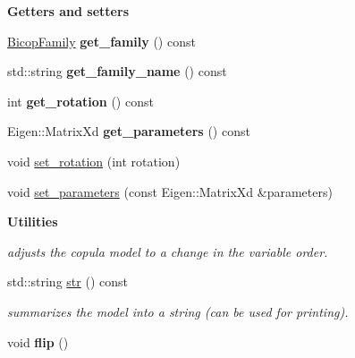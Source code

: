 \begin{Indent}{\bf Getters and setters}\par
\begin{DoxyCompactItemize}
\item 
\hyperlink{namespacevinecopulib_a42e95cc06d33896199caab0c11ad44f3}{Bicop\+Family} {\bfseries get\+\_\+family} () const \hypertarget{classvinecopulib_1_1_bicop_a68ab3556ee3bb3d02814fd978573bf3b}{}\label{classvinecopulib_1_1_bicop_a68ab3556ee3bb3d02814fd978573bf3b}

\item 
std\+::string {\bfseries get\+\_\+family\+\_\+name} () const \hypertarget{classvinecopulib_1_1_bicop_a4d4fbc0fdca17564c23f4814d5d2fbe7}{}\label{classvinecopulib_1_1_bicop_a4d4fbc0fdca17564c23f4814d5d2fbe7}

\item 
int {\bfseries get\+\_\+rotation} () const \hypertarget{classvinecopulib_1_1_bicop_ab8e52577a50fbfc57277f9240d8eac03}{}\label{classvinecopulib_1_1_bicop_ab8e52577a50fbfc57277f9240d8eac03}

\item 
Eigen\+::\+Matrix\+Xd {\bfseries get\+\_\+parameters} () const \hypertarget{classvinecopulib_1_1_bicop_a93ab0dd89826e50b209ea3760f251f2f}{}\label{classvinecopulib_1_1_bicop_a93ab0dd89826e50b209ea3760f251f2f}

\item 
void \hyperlink{classvinecopulib_1_1_bicop_a4e359624560a089273b25dc74879bd16}{set\+\_\+rotation} (int rotation)
\item 
void \hyperlink{classvinecopulib_1_1_bicop_ac8d1d4266b0fd7e2f971d0149f881ef9}{set\+\_\+parameters} (const Eigen\+::\+Matrix\+Xd \&parameters)
\end{DoxyCompactItemize}
\end{Indent}
\begin{Indent}{\bf Utilities}\par
{\em adjust\textquotesingle{}s the copula model to a change in the variable order. }\begin{DoxyCompactItemize}
\item 
std\+::string \hyperlink{classvinecopulib_1_1_bicop_abe2b1406729a15c22e9588b0c38c4047}{str} () const \hypertarget{classvinecopulib_1_1_bicop_abe2b1406729a15c22e9588b0c38c4047}{}\label{classvinecopulib_1_1_bicop_abe2b1406729a15c22e9588b0c38c4047}

\begin{DoxyCompactList}\small\item\em summarizes the model into a string (can be used for printing). \end{DoxyCompactList}\item 
void {\bfseries flip} ()\hypertarget{classvinecopulib_1_1_bicop_a59b7087b3857350df25ff684ab96f377}{}\label{classvinecopulib_1_1_bicop_a59b7087b3857350df25ff684ab96f377}

\end{DoxyCompactItemize}
\end{Indent}


